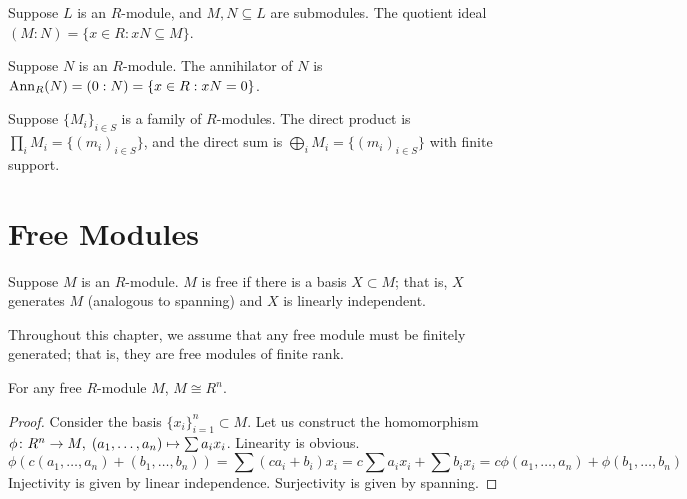 \begin{definition}
    Suppose \(L\) is an \(R\)-module,
    and \(M,N \subseteq L\) are submodules.
    The quotient ideal \((M:N) = \{x \in R : xN \subseteq M\}\).
\end{definition}
\begin{definition}
    Suppose \(N\) is an \(R\)-module.
    The annihilator of \(N\) is \(\operatorname{Ann}_R(N) = (0:N) = \{x \in R : xN = 0\}\).
\end{definition}

\begin{definition}
    Suppose \({\{M_i\}}_{i \in S}\) is a family of \(R\)-modules.
    The direct product is \(\prod_i M_i = \{{(m_i)}_{i \in S}\}\),
    and the direct sum is \(\bigoplus_i M_i = \{{(m_i)_{i \in S}}\}\) with finite support.
\end{definition}


\section{Free Modules}

\begin{definition}
    Suppose \(M\) is an \(R\)-module.
    \(M\) is free if there is a basis \(X \subset M\);
    that is, \(X\) generates \(M\) (analogous to spanning)
    and \(X\) is linearly independent.
\end{definition}
\begin{remark}
    Throughout this chapter,
    we assume that any free module must be finitely generated;
    that is, they are free modules of finite rank.
\end{remark}
\begin{lemma}
    For any free \(R\)-module \(M\), \(M \cong R^n\).
\end{lemma}
\begin{proof}
    Consider the basis \({\{x_i\}}_{i=1}^n \subset M\).
    Let us construct the homomorphism \(\phi\colon R^n\to M,\;(a_1,\hdots,a_n)\mapsto\sum a_i x_i\).
    Linearity is obvious.
    \begin{equation*}
        \phi(c(a_1,\hdots,a_n)+(b_1,\hdots,b_n))
        = \sum (ca_i + b_i)x_i
        = c \sum a_i x_i + \sum b_i x_i
        = c\phi(a_1,\hdots,a_n) + \phi(b_1,\hdots,b_n)
    \end{equation*}
    Injectivity is given by linear independence.
    Surjectivity is given by spanning.
\end{proof}


